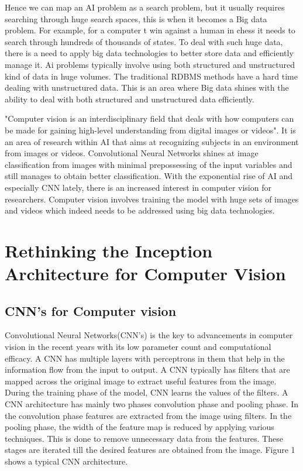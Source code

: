 \documentclass[sigconf]{acmart}
\begin{document}
Hence we can map an AI problem as a search problem, but it usually requires searching through huge search spaces, this is when it becomes a Big data problem. For example, for a computer t win against a human in chess it needs to search through hundreds of thousands of states. To deal with such huge data, there is a need to apply big data technologies to better store data and efficiently manage it. Ai problems typically involve using both structured and unstructured kind of data in huge volumes. The traditional RDBMS methods have a hard time dealing with unstructured data. This is an area where Big data shines with the ability to deal with both structured and unstructured data efficiently.

"Computer vision is an interdisciplinary field that deals with how computers can be made for gaining high-level understanding from digital images or videos".\cite{www-wiki1} It is an area of research within AI that aims at recognizing subjects in an environment from images or videos. Convolutional Neural Networks shines at image classification from images with minimal prepossessing of the input variables and still manages to obtain better classification. With the exponential rise of AI and especially CNN lately, there is an increased interest in computer vision for researchers. Computer vision involves training the model with huge sets of images and videos which indeed needs to be addressed using big data technologies.

\section{Rethinking the Inception Architecture for Computer Vision}

\subsection{CNN's for Computer vision}

Convolutional Neural Networks(CNN's) is the key to advancements in computer vision in the recent years with its low parameter count and computational efficacy. A CNN has multiple layers with perceptrons in them that help in the information flow from the input to output. A CNN typically has filters that are mapped across the original image to extract useful features from the image. During the training phase of the model, CNN learns the values of the filters. A CNN architecture has mainly two phases convolution phase and pooling phase. In the convolution phase features are extracted from the image using filters. In the pooling phase, the width of the feature map is reduced by applying various techniques. This is done to remove unnecessary data from the features. These stages are iterated till the desired features are obtained from the image.\cite{Williamson}   Figure 1 shows a typical CNN architecture.\cite{google}
\end{document}
